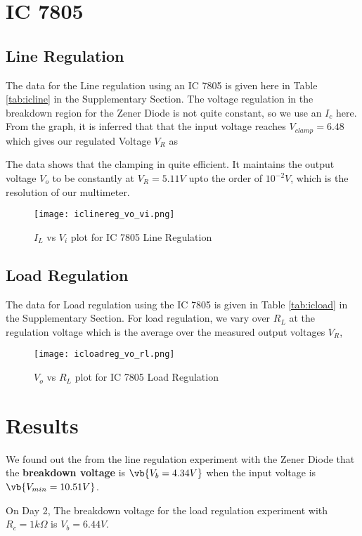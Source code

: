 \documentclass{scrartcl}
\newcommand{\1}{\mathbbm{1}}
\begin{document}
\section{IC 7805}
\subsection{Line Regulation}
The data for the Line regulation using an IC 7805 is given here in Table \ref{tab:icline} in the Supplementary Section.
The voltage regulation in the breakdown region for the Zener Diode is not quite constant, so we use an $I_c$ here. 
From the graph, it is inferred that that the input voltage reaches $V_{clamp} = 6.48$ which gives our 
regulated Voltage $V_R$ as 
\begin{center}\end{center}
The data shows that the clamping in quite efficient. It maintains the output voltage $V_o$ to 
be constantly at $V_R=5.11V$ upto the order of $10^{-2} V$, which is the resolution of our multimeter. 
\begin{figure}[H]
	\centering
	\texttt{[image: iclinereg\_vo\_vi.png]}
	\caption{$I_L$ vs $V_i$ plot for IC 7805 Line Regulation}
\end{figure}

\subsection{Load Regulation}
The data for Load regulation using the IC 7805 is given in Table \ref{tab:icload} in the Supplementary Section.
For load regulation, we vary over $R_L$ at the regulation voltage which is the average over the measured 
output voltages $V_R$,
\begin{center}\end{center}
\begin{figure}[H]
	\centering
	\texttt{[image: icloadreg\_vo\_rl.png]}
	\caption{$V_o$ vs $R_L$ plot for IC 7805 Load Regulation}
\end{figure}
\section{Results}
We found out the from the line regulation experiment with the Zener Diode that the \textbf{breakdown voltage} is $\vb{V_b = 4.34V}$ when
the input voltage is $\vb{V_{min} = 10.51V}$. 

On Day 2, The breakdown voltage for the load regulation experiment with $R_c = 1k\Omega$ is $V_b = 6.44V$.
\end{document}
